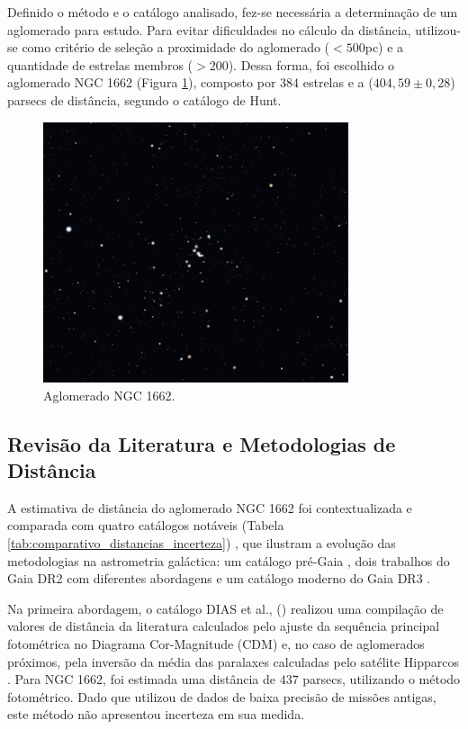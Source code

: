 \documentclass[12pt]{projeto}
\begin{document}
Definido o método e o catálogo analisado, fez-se necessária a determinação de um aglomerado para estudo. Para evitar dificuldades no cálculo da distância, utilizou-se como critério de seleção a proximidade do aglomerado (\(<500\)pc) e a quantidade de estrelas membros (\(>200\)). Dessa forma, foi escolhido o aglomerado NGC 1662 (Figura \ref{fig:NGC1662}), composto por \(384\) estrelas e a (\(404,59 \pm 0,28\)) parsecs de distância, segundo o catálogo de Hunt.
\begin{figure}[ht]
\centering
\includegraphics[width= 0.8\textwidth]{NGC_1662.png}
\caption{\label{fig:NGC1662} Aglomerado NGC 1662.}
\end{figure}

\subsection{Revisão da Literatura e Metodologias de Distância}

A estimativa de distância do aglomerado NGC 1662 foi contextualizada e comparada com quatro catálogos notáveis (Tabela \ref{tab:comparativo_distancias_incerteza}) , que ilustram a evolução das metodologias na astrometria galáctica: um catálogo pré-Gaia \cite{dias_new_2002}, dois trabalhos do Gaia DR2 com diferentes abordagens \cite{cantat-gaudin_painting_2020, dias_updated_2021} e um catálogo moderno do Gaia DR3 \cite{hunt_improving_2024}.

Na primeira abordagem, o catálogo DIAS et al., (\citeyear{dias_new_2002})  realizou uma compilação de valores de distância da literatura calculados pelo ajuste da sequência principal fotométrica no Diagrama Cor-Magnitude (CDM) e, no caso de aglomerados próximos, pela inversão da média das paralaxes calculadas pelo satélite Hipparcos \cite{esa_hipparcos_1997}. Para NGC 1662, foi estimada uma distância de \(437\) parsecs, utilizando o método fotométrico. Dado que utilizou de dados de baixa precisão de missões antigas, este método não apresentou incerteza em sua medida.
\end{document}
